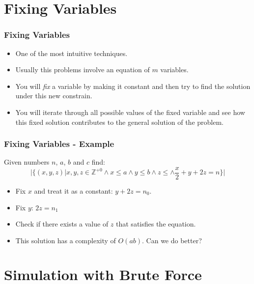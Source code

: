 \documentclass{beamer}
\begin{document}
\section{Fixing Variables}

\begin{frame}
	\frametitle{Fixing Variables}

	\begin{itemize}
		\item One of the most intuitive techniques.
		\item Usually this problems involve an equation of $m$ variables.
		\item You will \textit{fix} a variable by making it constant and then try to find the solution under this new constrain.
		\item You will iterate through all possible values of the fixed variable and see how this fixed solution contributes to the general solution of the problem.
	\end{itemize}
\end{frame}

\begin{frame}[fragile]
	\frametitle{Fixing Variables - Example}

	Given numbers $n$, $a$, $b$ and $c$ find:
	$$|\{(x, y, z) | x, y, z \in \mathbb{Z}^{+0}
	\wedge x \leq a \wedge y \leq b \wedge z \leq
	\wedge \frac{x}{2} + y + 2z = n\}|$$

	\begin{itemize}
		\item<2-> Fix $x$ and treat it as a constant: $y + 2z = n_0$.
		\item<3-> Fix $y$: $2z = n_1$
		\item<4-> Check if there exists a value of $z$ that satisfies the equation.
		\item<5-> This solution has a complexity of $O(ab)$. Can we do better?
	\end{itemize}
\end{frame}

\section{Simulation with Brute Force}
\end{document}
